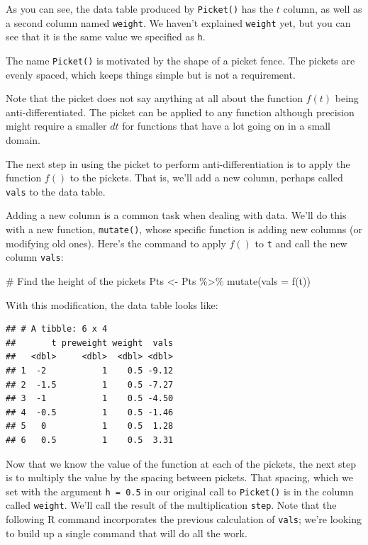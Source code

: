 \documentclass[
  letterpaper,
  DIV=11,
  numbers=noendperiod,
  oneside]{scrreprt}
\newenvironment{Shaded}{\begin{snugshade}}{\end{snugshade}}
\newcommand{\AttributeTok}[1]{\textcolor[rgb]{0.40,0.46,0.14}{#1}}
\newcommand{\CommentTok}[1]{\textcolor[rgb]{0.37,0.37,0.37}{#1}}
\newcommand{\FunctionTok}[1]{\textcolor[rgb]{0.28,0.35,0.67}{#1}}
\newcommand{\NormalTok}[1]{\textcolor[rgb]{0.00,0.46,0.62}{#1}}
\newcommand{\OtherTok}[1]{\textcolor[rgb]{0.00,0.46,0.62}{#1}}
\newcommand{\SpecialCharTok}[1]{\textcolor[rgb]{0.37,0.37,0.37}{#1}}
\begin{document}
As you can see, the data table produced by \texttt{Picket()} has the
\(t\) column, as well as a second column named \texttt{weight}. We
haven't explained \texttt{weight} yet, but you can see that it is the
same value we specified as \texttt{h}.

The name \texttt{Picket()} is motivated by the shape of a picket fence.
The pickets are evenly spaced, which keeps things simple but is not a
requirement.

Note that the picket does not say anything at all about the function
\(f(t)\) being anti-differentiated. The picket can be applied to any
function although precision might require a smaller \(dt\) for functions
that have a lot going on in a small domain.

The next step in using the picket to perform anti-differentiation is to
apply the function \(f()\) to the pickets. That is, we'll add a new
column, perhaps called \texttt{vals} to the data table.

Adding a new column is a common task when dealing with data. We'll do
this with a new function, \texttt{mutate()}, whose specific function is
adding new columns (or modifying old ones). Here's the command to apply
\(f()\) to \texttt{t} and call the new column \texttt{vals}:

\begin{Shaded}
\begin{Highlighting}[]
\CommentTok{\# Find the height of the pickets}
\NormalTok{Pts }\OtherTok{\textless{}{-}}\NormalTok{ Pts }\SpecialCharTok{\%\textgreater{}\%}
  \FunctionTok{mutate}\NormalTok{(}\AttributeTok{vals =} \FunctionTok{f}\NormalTok{(t))}
\end{Highlighting}
\end{Shaded}

With this modification, the data table looks like:

\begin{verbatim}
## # A tibble: 6 x 4
##       t preweight weight  vals
##   <dbl>     <dbl>  <dbl> <dbl>
## 1  -2           1    0.5 -9.12
## 2  -1.5         1    0.5 -7.27
## 3  -1           1    0.5 -4.50
## 4  -0.5         1    0.5 -1.46
## 5   0           1    0.5  1.28
## 6   0.5         1    0.5  3.31
\end{verbatim}

Now that we know the value of the function at each of the pickets, the
next step is to multiply the value by the spacing between pickets. That
spacing, which we set with the argument \texttt{h\ =\ 0.5} in our
original call to \texttt{Picket()} is in the column called
\texttt{weight}. We'll call the result of the multiplication
\texttt{step}. Note that the following R command incorporates the
previous calculation of \texttt{vals}; we're looking to build up a
single command that will do all the work.
\end{document}
